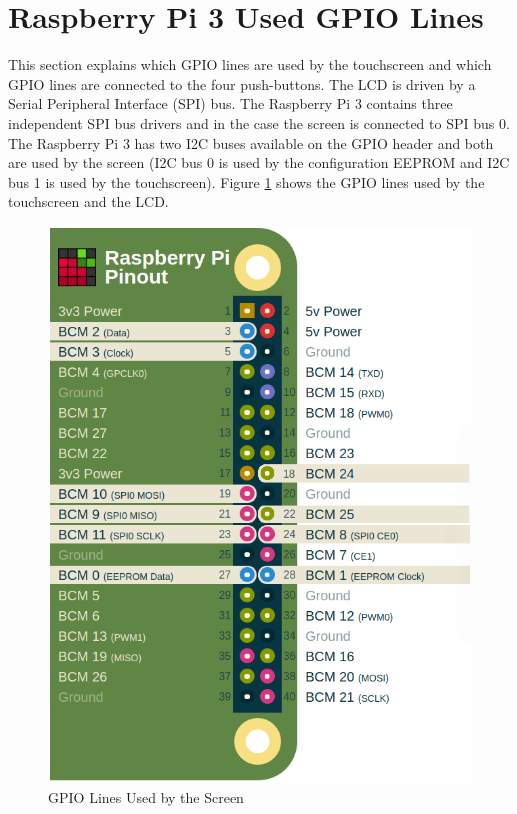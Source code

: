 \documentclass{article}
\begin{document}
\section{Raspberry Pi 3 Used GPIO Lines}

This section explains which GPIO lines are used by the touchscreen and which GPIO lines are connected to the four push-buttons. The LCD is driven by a Serial Peripheral Interface (SPI) bus. The Raspberry Pi 3 contains three independent SPI bus drivers and in the case the screen is connected to SPI bus 0. The Raspberry Pi 3 has two I2C buses available on the GPIO header and both are used by the screen (I2C bus 0 is used by the configuration EEPROM and I2C bus 1 is used by the touchscreen). Figure \ref{Screen_Used_GPIO} shows the GPIO lines used by the touchscreen and the LCD.

	\begin{figure}[H]
		\centering
		\includegraphics[scale=0.3]{pics/GPIO_Used_By_Screen.png}
		\caption{GPIO Lines Used by the Screen}
		\label{Screen_Used_GPIO}
	\end{figure} 
\end{document}
